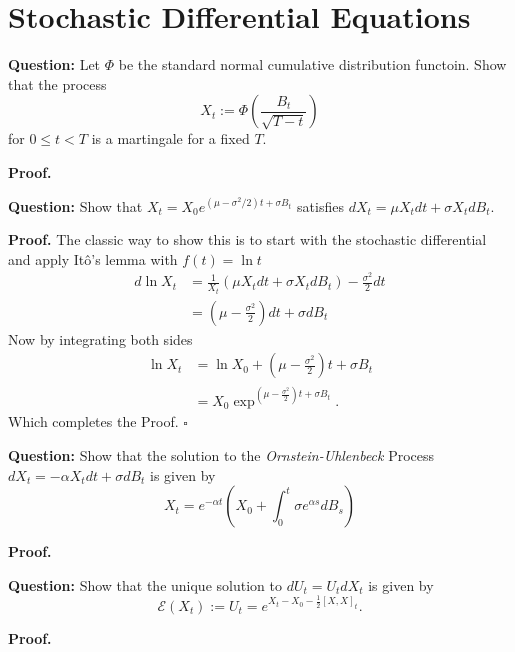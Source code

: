 \documentclass{article}
\begin{document}
\newpage
\section{Stochastic Differential Equations}

\begin{tcolorbox}[colframe=black,colback=gray!5,boxrule=0.5pt]
\textbf{Question:} Let $\Phi$ be the standard normal cumulative distribution functoin. Show that the process $$X_t := \Phi(\frac{B_t}{\sqrt{T-t}})$$ for $0\leq t<T$ is a martingale for a fixed $T$.
\end{tcolorbox}
\textbf{Proof.}




\begin{tcolorbox}[colframe=black,colback=gray!5,boxrule=0.5pt]
\textbf{Question:} Show that $X_t = X_0 e^{(\mu-\sigma^2/2)t + \sigma B_t}$ satisfies $dX_t =\mu X_t dt + \sigma X_t dB_t$.
\end{tcolorbox}
\textbf{Proof.} The classic way to show this is to start with the stochastic differential and apply Itô's lemma with $f(t) = \ln t$
\begin{align*}
    d\ln X_t  &= \frac{1}{X_t}(\mu X_t dt + \sigma X_t dB_t) - \frac{\sigma^2}{2}dt \\
              &= \left(\mu - \frac{\sigma^2}{2}\right)dt + \sigma dB_t
\end{align*}
Now by integrating both sides
\begin{align*}
    \ln X_t &= \ln X_0 + \left(\mu - \frac{\sigma^2}{2}\right)t + \sigma B_t \\
    &= X_0 \exp^{\left(\mu - \frac{\sigma^2}{2}\right)t + \sigma B_t}.
\end{align*}
Which completes the Proof. $\square$

\begin{tcolorbox}[colframe=black,colback=gray!5,boxrule=0.5pt]
\textbf{Question:} Show that the solution to the \textit{Ornstein-Uhlenbeck} Process $dX_t = -\alpha X_tdt + \sigma dB_t$ is given by 
$$X_t = e^{-\alpha t}\left(X_0 + \int_0^t\sigma e^{\alpha s}dB_s\right)$$
\end{tcolorbox}
\textbf{Proof.}

\begin{tcolorbox}[colframe=black,colback=gray!5,boxrule=0.5pt]
\textbf{Question:} Show that the unique solution to $dU_t = U_tdX_t$ is given by 
$$\mathcal{E}(X_t) := U_t = e^{X_t - X_0 - \frac{1}{2}[X,X]_t}.$$
\end{tcolorbox}
\textbf{Proof.}
\end{document}

